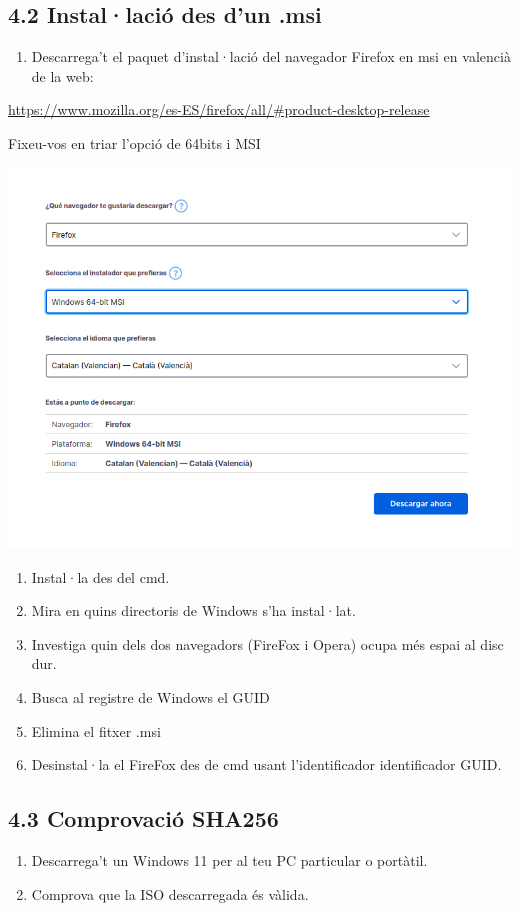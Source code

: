 \documentclass[
  a4paper,
]{article}
\providecommand{\tightlist}{%
  \setlength{\itemsep}{0pt}\setlength{\parskip}{0pt}}
\begin{document}
\subsection{4.2 Instal·lació des d'un
.msi}\label{installaciuxf3-des-dun-.msi}

\begin{enumerate}
\def\labelenumi{\arabic{enumi}.}
\tightlist
\item
  Descarrega't el paquet d'instal·lació del navegador Firefox en msi en
  valencià de la web:
\end{enumerate}

\url{https://www.mozilla.org/es-ES/firefox/all/\#product-desktop-release}

Fixeu-vos en triar l'opció de 64bits i MSI

\includegraphics{png/firefoxDescarregaMSI.png}

\begin{enumerate}
\def\labelenumi{\arabic{enumi}.}
\setcounter{enumi}{1}
\item
  Instal·la des del cmd.
\item
  Mira en quins directoris de Windows s'ha instal·lat.
\item
  Investiga quin dels dos navegadors (FireFox i Opera) ocupa més espai
  al disc dur.
\item
  Busca al registre de Windows el GUID
\item
  Elimina el fitxer .msi
\item
  Desinstal·la el FireFox des de cmd usant l'identificador identificador
  GUID.
\end{enumerate}

\subsection{4.3 Comprovació SHA256}\label{comprovaciuxf3-sha256}

\begin{enumerate}
\def\labelenumi{\arabic{enumi}.}
\tightlist
\item
  Descarrega't un Windows 11 per al teu PC particular o portàtil.
\item
  Comprova que la ISO descarregada és vàlida.
\end{enumerate}
\end{document}
